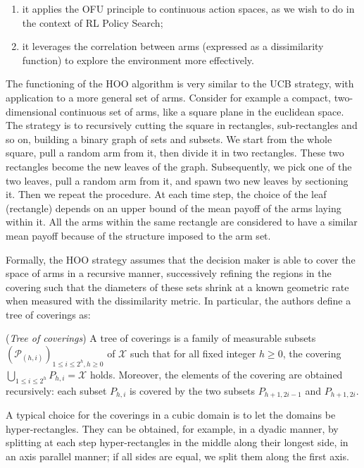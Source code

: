 \begin{enumerate}
\item it applies the \gls{OFU} principle to continuous action spaces, as we wish to do in the context of \gls{RL} Policy Search;
\item it leverages the correlation between arms (expressed as a dissimilarity function) to explore the environment more effectively.
\end{enumerate} 

The functioning of the \gls{HOO} algorithm is very similar to the \gls{UCB} strategy, with application to a more general set of arms. Consider for example a compact, two-dimensional continuous set of arms, like a square plane in the euclidean space. The strategy is to recursively cutting the square in rectangles, sub-rectangles and so on, building a binary graph of sets and subsets. We start from the whole square, pull a random arm from it, then divide it in two rectangles. These two rectangles become the new leaves of the graph. Subsequently, we pick one of the two leaves, pull a random arm from it, and spawn two new leaves by sectioning it. Then we repeat the procedure. At each time step, the choice of the leaf (rectangle) depends on an upper bound of the mean payoff of the arms laying within it. All the arms within the same rectangle are considered to have a similar mean payoff because of the structure imposed to the arm set.
 
Formally, the \gls{HOO} strategy assumes that the decision maker is able to cover the space of arms in a recursive manner, successively refining the regions in the covering such that the diameters of these sets shrink at a known geometric rate when measured with the dissimilarity metric. In particular, the authors define a tree of coverings as:

\begin{definition} \label{def:treeofcoverings}
(\emph{Tree of coverings}) A tree of coverings is a family of measurable subsets $(\mathcal{P}_{(h,i)})_{1\leq i\leq 2^h, h\geq 0}$ of $\mathcal{X}$ such that for all fixed integer $h\geq 0$, the covering $\bigcup_{1\leq i\leq 2^h}P_{h,i}=\mathcal{X}$ holds. Moreover, the elements of the covering are obtained recursively: each subset $P_{h,i}$ is covered by the two subsets $P_{h+1,2i-1}$ and $P_{h+1,2i}$.
\end{definition}

\begin{remark}
A typical choice for the coverings in a cubic domain is to let the domains be hyper-rectangles. They can be obtained, for example, in a dyadic manner, by splitting at each step hyper-rectangles in the middle along their longest side, in an axis parallel manner; if all sides are equal, we split them along the first axis.
\end{remark} 

